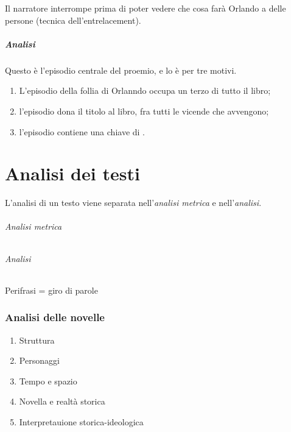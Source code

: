 \documentclass[a4paper]{article}
\begin{document}
Il narratore interrompe prima di poter vedere che cosa farà Orlando a delle persone
(tecnica dell'entrelacement).

\subsubsection{Analisi}

Questo è l'episodio centrale del proemio, e lo è per tre motivi.
\begin{enumerate}
    \item L'episodio della follia di Orlanndo occupa un terzo di tutto il libro;
    \item l'episodio dona il titolo al libro, fra tutti le vicende che avvengono;
    \item l'episodio contiene una chiave di .
\end{enumerate}



\pagebreak

\part{Analisi dei testi}


L'analisi di un testo viene separata nell'\textit{analisi metrica} e nell'\textit{analisi}.

\paragraph{Analisi metrica}

\phantom{ }\vspace{0.1cm}

\paragraph{Analisi}

Perifrasi = giro di parole

\section{Analisi delle novelle}

\begin{enumerate}
    \item Struttura
    \item Personaggi
    \item Tempo e spazio
    \item Novella e realtà storica
    \item Interpretauione storica-ideologica
\end{enumerate}
\end{document}
